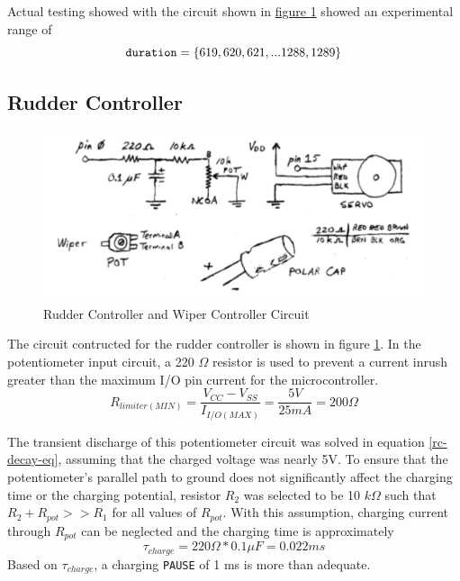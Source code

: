 \documentclass[11pt]{article}
\begin{document}
Actual testing showed with the circuit shown in
\hyperref[rudder-circuit]{figure \ref{rudder-circuit}}
showed an experimental range of
\begin{equation}
\textrm{\texttt{duration}}=\{619, 620, 621,...1288, 1289\}
\label{discharge-time-domain}
\end{equation}

\subsection{Rudder Controller}

\begin{figure}[h!]
\centering
\includegraphics[width=.7\textwidth]{rudder-circuit.pdf}
\caption{Rudder Controller and Wiper Controller Circuit}
\label{rudder-circuit}
\end{figure}

The circuit contructed for the rudder controller is shown in figure
\ref{rudder-circuit}. In the potentiometer input circuit, a 220 $\Omega$
resistor is used to prevent a current inrush greater than the maximum
I/O pin current for the microcontroller.
\begin{equation*}
R_{limiter(MIN)}=\frac{V_{CC}-V_{SS}}{I_{I/O(MAX)}}=\frac{5V}{25mA}=200\Omega
\end{equation*}

The transient discharge of this potentiometer circuit was solved in
equation \ref{rc-decay-eq}, assuming that the charged voltage was nearly 5V.
To ensure that the potentiometer's parallel path to ground does not significantly
affect the charging time or the charging potential, resistor $R_{2}$ was
selected to be 10 $k\Omega$ such that $R_{2}+R_{pot}>>R_{1}$ for all values
of $R_{pot}$. With this assumption, charging current through $R_{pot}$
can be neglected and the charging time is approximately
\begin{equation*}
\tau_{charge}=220\Omega*0.1\mu F=0.022 ms
\end{equation*}
Based on $\tau_{charge}$, a charging \texttt{PAUSE} of 1 ms is more than adequate.
\end{document}
